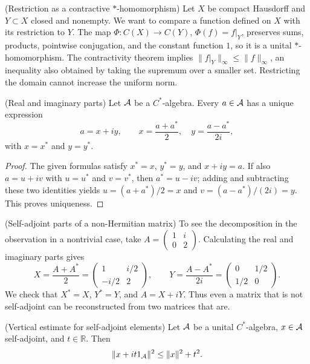 \begin{cthejemplo}{(Restriction as a contractive $*$-homomorphism)}
Let $X$ be compact Hausdorff and $Y\subset X$ closed and nonempty.
We want to compare a function defined on $X$ with its restriction to
$Y$. The map $\Phi:C(X)\to C(Y)$,
$\Phi(f)=f|_Y$, preserves sums, products, pointwise conjugation, and the
constant function $1$, so it is a unital $*$-homomorphism.
The contractivity theorem implies
$\|f|_Y\|_\infty\le\|f\|_\infty$, an inequality also obtained by
taking the supremum over a smaller set. Restricting the domain cannot
increase the uniform norm.
\end{cthejemplo}

\begin{cthobservacion}{(Real and imaginary parts)}
Let $\mathcal A$ be a $C^*$-algebra. Every $a\in\mathcal A$ has a unique expression
\[
 a=x+iy,
 \qquad
 x=\frac{a+a^*}{2},\quad y=\frac{a-a^*}{2i},
\]
with $x=x^*$ and $y=y^*$.
\end{cthobservacion}

\begin{proof}[Proof]
The given formulas satisfy $x^*=x$, $y^*=y$, and $x+iy=a$. If also
$a=u+iv$ with $u=u^*$ and $v=v^*$, then $a^*=u-iv$; adding and subtracting
these two identities yields $u=(a+a^*)/2=x$ and
$v=(a-a^*)/(2i)=y$. This proves uniqueness.
\end{proof}

\begin{cthejemplo}{(Self-adjoint parts of a non-Hermitian matrix)}
To see the decomposition in the observation in a nontrivial case,
take $A=\begin{pmatrix}1&i\\0&2\end{pmatrix}$.
Calculating the real and imaginary parts gives
\[
 X=\frac{A+A^*}{2}
 =\begin{pmatrix}1&i/2\\-i/2&2\end{pmatrix},
 \qquad
 Y=\frac{A-A^*}{2i}
 =\begin{pmatrix}0&1/2\\1/2&0\end{pmatrix}.
\]
We check that $X^*=X$, $Y^*=Y$, and $A=X+iY$.
Thus even a matrix that is not self-adjoint can be reconstructed from
two matrices that are.
\end{cthejemplo}

\begin{cthlema}{(Vertical estimate for self-adjoint elements)}
Let $\mathcal A$ be a unital $C^*$-algebra, $x\in\mathcal A$ self-adjoint, and $t\in\mathbb R$. Then
\[
 \|x+it1_\mathcal A\|^2\le \|x\|^2+t^2.
\]
\end{cthlema}

